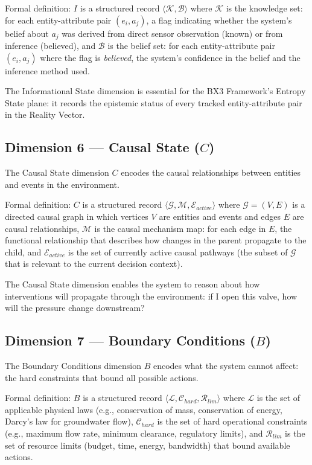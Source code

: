 \documentclass[12pt]{article}
\begin{document}
Formal definition: $I$ is a structured record $\langle \mathcal{K}, \mathcal{B} \rangle$ where $\mathcal{K}$ is the knowledge set: for each entity-attribute pair $(e_i, a_j)$, a flag indicating whether the system's belief about $a_j$ was derived from direct sensor observation (known) or from inference (believed), and $\mathcal{B}$ is the belief set: for each entity-attribute pair $(e_i, a_j)$ where the flag is \textit{believed}, the system's confidence in the belief and the inference method used.

The Informational State dimension is essential for the BX3 Framework's Entropy State plane: it records the epistemic status of every tracked entity-attribute pair in the Reality Vector.

\subsection{Dimension 6 --- Causal State ($C$)}
\label{sec:causal}

The Causal State dimension $C$ encodes the causal relationships between entities and events in the environment.

Formal definition: $C$ is a structured record $\langle \mathcal{G}, \mathcal{M}, \mathcal{E}_{active} \rangle$ where $\mathcal{G} = (V, E)$ is a directed causal graph in which vertices $V$ are entities and events and edges $E$ are causal relationships, $\mathcal{M}$ is the causal mechanism map: for each edge in $E$, the functional relationship that describes how changes in the parent propagate to the child, and $\mathcal{E}_{active}$ is the set of currently active causal pathways (the subset of $\mathcal{G}$ that is relevant to the current decision context).

The Causal State dimension enables the system to reason about how interventions will propagate through the environment: if I open this valve, how will the pressure change downstream?

\subsection{Dimension 7 --- Boundary Conditions ($B$)}
\label{sec:boundary}

The Boundary Conditions dimension $B$ encodes what the system cannot affect: the hard constraints that bound all possible actions.

Formal definition: $B$ is a structured record $\langle \mathcal{L}, \mathcal{C}_{hard}, \mathcal{R}_{lim} \rangle$ where $\mathcal{L}$ is the set of applicable physical laws (e.g., conservation of mass, conservation of energy, Darcy's law for groundwater flow), $\mathcal{C}_{hard}$ is the set of hard operational constraints (e.g., maximum flow rate, minimum clearance, regulatory limits), and $\mathcal{R}_{lim}$ is the set of resource limits (budget, time, energy, bandwidth) that bound available actions.
\end{document}
